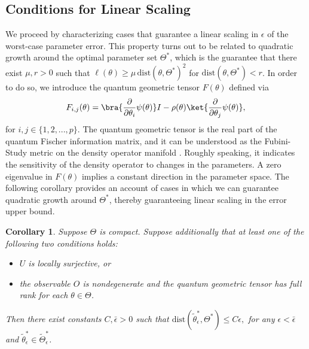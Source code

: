 \documentclass[letterpaper, 10 pt]{IEEEtran}  %
\newcommand{\dist}{\mathrm{dist}}
\newtheorem{corollary}{Corollary}
\begin{document}
\subsection{Conditions for Linear Scaling}
We proceed by characterizing cases that guarantee a linear scaling in $\epsilon$ of the worst-case parameter error. 
This property turns out to be related to quadratic growth around the optimal parameter set $\Theta^*$, which is the guarantee that there exist $\mu, r>0$ such that $\ell(\theta) \ge \mu \, \dist(\theta, \Theta^*)^2$ for $\dist(\theta, \Theta^*) < r$. 
In order to do so, we introduce the quantum geometric tensor $F(\theta)$ defined via 
\begin{equation}
   F_{i,j}(\theta)=\bra{\frac{\partial}{\partial\theta_i}\psi(\theta)} I-\rho(\theta) \ket{\frac{\partial}{\partial\theta_j} \psi(\theta)},
\end{equation}
for $i,j \in \{1,2,...,p\}$. The quantum geometric tensor is the real part of the quantum Fischer information matrix, and it can be understood as the Fubini-Study metric on the density operator manifold \cite{cheng2013}. 
Roughly speaking, it indicates the sensitivity of the density operator to changes in the parameters. A zero eigenvalue in $F(\theta)$ implies a constant direction in the parameter space.
The following corollary provides an account of cases in which we can guarantee quadratic growth around $\Theta^*$, thereby guaranteeing linear scaling in the error upper bound. 
\begin{corollary}
   Suppose $\Theta$ is compact.
   Suppose additionally that at least one of the following two conditions holds: 
   \begin{itemize}
      \item $U$ is locally surjective, or 
      \item the observable $O$ is nondegenerate and the quantum geometric tensor has full rank for each $\theta \in \Theta$.
   \end{itemize} 
   Then there exist constants $C, \bar\epsilon>0$ such that $\mathrm{dist}({\tilde{\theta}^*_\epsilon, \Theta^*})\le C \epsilon,$ 
for any  $\epsilon < \bar\epsilon$ and $\tilde{\theta}_\epsilon^* \in \tilde{\Theta}_\epsilon^*$.
\end{corollary} 
\end{document}
